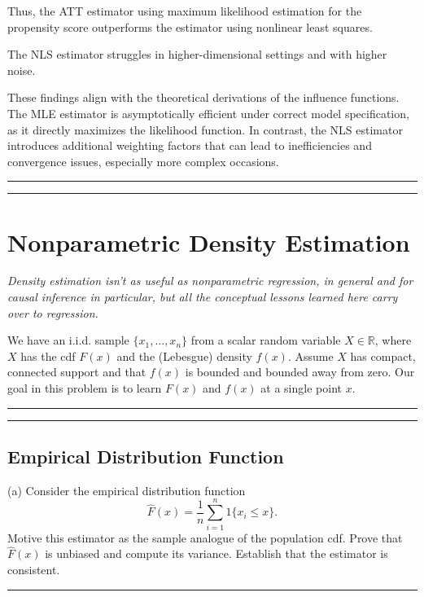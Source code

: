 \documentclass{article}
\newenvironment{colorparagraph}[1]{\par\color{#1}}{\par}
\begin{document}
Thus, the ATT estimator using maximum likelihood estimation for the propensity score outperforms the estimator using nonlinear least squares.

The NLS estimator struggles in higher-dimensional settings and with higher noise.

These findings align with the theoretical derivations of the influence functions. The MLE estimator is asymptotically efficient under correct model specification, as it directly maximizes the likelihood function. In contrast, the NLS estimator introduces additional weighting factors that can lead to inefficiencies and convergence issues, especially more complex occasions.

\begin{colorparagraph}{questioncolor}

\rule{\textwidth}{0.5pt}
\label{q2}
\rule{\textwidth}{0.5pt}
\section{Nonparametric Density Estimation}

\textit{Density estimation isn't as useful as nonparametric regression, in general and for causal inference in particular, but all the conceptual lessons learned here carry over to regression.}

We have an i.i.d. sample \(\{x_1, \dots, x_n\}\) from a scalar random variable \( X \in \mathbb{R} \), where \( X \) has the cdf \( F(x) \) and the (Lebesgue) density \( f(x) \). Assume \( X \) has compact, connected support and that \( f(x) \) is bounded and bounded away from zero. Our goal in this problem is to learn \( F(x) \) and \( f(x) \) at a single point \( x \).

\rule{\textwidth}{0.5pt}
\end{colorparagraph}

\begin{colorparagraph}{questioncolor}
\label{q2a}
\rule{\textwidth}{0.5pt}
\subsection{Empirical Distribution Function}
(a) Consider the empirical distribution function
\[
\hat{F}(x) = \frac{1}{n} \sum_{i=1}^n 1\{x_i \leq x\}.
\]
Motive this estimator as the sample analogue of the population cdf. Prove that \( \hat{F}(x) \) is unbiased and compute its variance. Establish that the estimator is consistent.

\rule{\textwidth}{0.5pt}
\end{colorparagraph}
\end{document}
